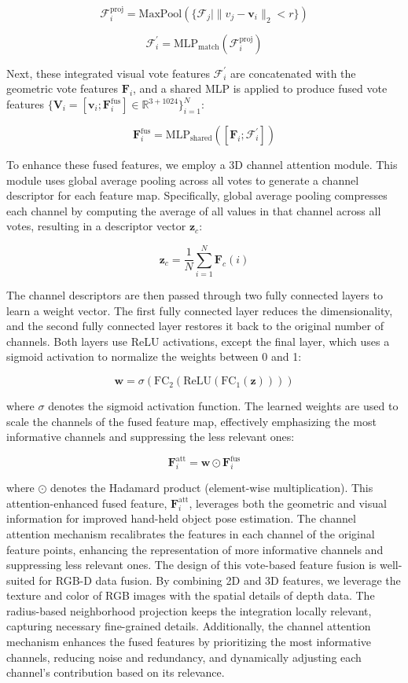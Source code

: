 \[
\mathcal{F}_i^{\text{proj}} = \text{MaxPool}(\{\mathcal{F}_j \mid \| v_j - \mathbf{v}_i \|_2 < r \})
\]

\[
\mathcal{F}_i^{'} = \text{MLP}_{\text{match}}(\mathcal{F}_i^{\text{proj}})
\]

\noindent Next, these integrated visual vote features \(\mathcal{F}_i^{'}\) are concatenated with the geometric vote features \(\mathbf{F}_i\), and a shared MLP is applied to produce fused vote features \(\{\mathbf{V}_i = [\mathbf{v}_i; \mathbf{F}_i^{\text{fus}}] \in \mathbb{R}^{3+1024}\}_{i=1}^{N}\):

\[
\mathbf{F}_i^{\text{fus}} = \text{MLP}_{\text{shared}}([\mathbf{F}_i; \mathcal{F}_i^{'}])
\]

\noindent To enhance these fused features, we employ a 3D channel attention module. This module uses global average pooling across all votes to generate a channel descriptor for each feature map. Specifically, global average pooling compresses each channel by computing the average of all values in that channel across all votes, resulting in a descriptor vector \(\mathbf{z}_c\):

\[
\mathbf{z}_c = \frac{1}{N} \sum_{i=1}^{N} \mathbf{F}_c(i)
\]

\noindent The channel descriptors are then passed through two fully connected layers to learn a weight vector. The first fully connected layer reduces the dimensionality, and the second fully connected layer restores it back to the original number of channels. Both layers use ReLU activations, except the final layer, which uses a sigmoid activation to normalize the weights between 0 and 1:

\[
\mathbf{w} = \sigma(\text{FC}_2(\text{ReLU}(\text{FC}_1(\mathbf{z}))))
\]

\noindent where \(\sigma\) denotes the sigmoid activation function. The learned weights are used to scale the channels of the fused feature map, effectively emphasizing the most informative channels and suppressing the less relevant ones:

\[
\mathbf{F}_i^{\text{att}} = \mathbf{w} \odot \mathbf{F}_i^{\text{fus}}
\]

\noindent where \(\odot\) denotes the Hadamard product (element-wise multiplication). This attention-enhanced fused feature, \(\mathbf{F}_i^{\text{att}}\), leverages both the geometric and visual information for improved hand-held object pose estimation. The channel attention mechanism recalibrates the features in each channel of the original feature points, enhancing the representation of more informative channels and suppressing less relevant ones. The design of this vote-based feature fusion is well-suited for RGB-D data fusion. By combining 2D and 3D features, we leverage the texture and color of RGB images with the spatial details of depth data. The radius-based neighborhood projection keeps the integration locally relevant, capturing necessary fine-grained details. Additionally, the channel attention mechanism enhances the fused features by prioritizing the most informative channels, reducing noise and redundancy, and dynamically adjusting each channel's contribution based on its relevance.


